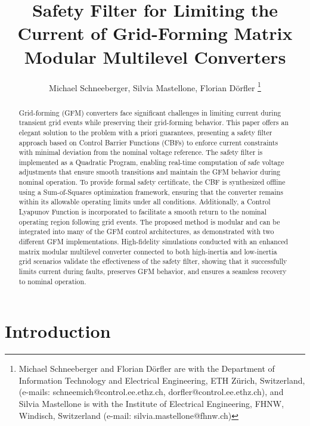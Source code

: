 \documentclass[lettersize,journal]{IEEEtran}
\begin{document}
\title{Safety Filter for Limiting the Current of Grid-Forming Matrix Modular Multilevel Converters}

\author{Michael Schneeberger, Silvia Mastellone, Florian D{\"o}rfler 
   \thanks{Michael Schneeberger and Florian D{\"o}rfler are with the Department of Information Technology and Electrical Engineering, ETH Z{\"u}rich, Switzerland, (e-mails: schneemich@control.ee.ethz.ch, dorfler@control.ee.ethz.ch), and Silvia Mastellone is with the Institute of Electrical Engineering, FHNW, Windisch, Switzerland (e-mail: silvia.mastellone@fhnw.ch)} %
}

\maketitle

\begin{abstract}
Grid-forming (GFM) converters face significant challenges in limiting current during transient grid events while preserving their grid-forming behavior. This paper offers an elegant solution to the problem with a priori guarantees, presenting a safety filter approach based on Control Barrier Functions (CBFs) to enforce current constraints with minimal deviation from the nominal voltage reference. The safety filter is implemented as a Quadratic Program, enabling real-time computation of safe voltage adjustments that ensure smooth transitions and maintain the GFM behavior during nominal operation. To provide formal safety certificate, the CBF is synthesized offline using a Sum-of-Squares optimization framework, ensuring that the converter remains within its allowable operating limits under all conditions. Additionally, a Control Lyapunov Function is incorporated to facilitate a smooth return to the nominal operating region following grid events. The proposed method is modular and can be integrated into many of the GFM control architectures, as demonstrated with two different GFM implementations. High-fidelity simulations conducted with an enhanced matrix modular multilevel converter connected to both high-inertia and low-inertia grid scenarios validate the effectiveness of the safety filter, showing that it successfully limits current during faults, preserves GFM behavior, and ensures a seamless recovery to nominal operation.
\end{abstract}


\section{Introduction}
\end{document}
